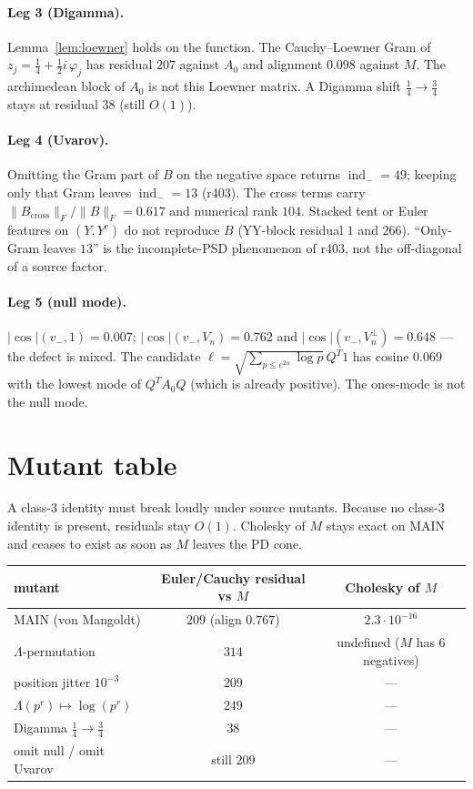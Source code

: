 \documentclass[11pt]{article}
\theoremstyle{remark}
\newcommand{\indm}{\operatorname{ind}_{-}}
\begin{document}
\paragraph{Leg 3 (Digamma).}
Lemma~\ref{lem:loewner} holds on the function.
The Cauchy--Loewner Gram of
$z_j=\tfrac14+\tfrac12 i\,\varphi_j$ has residual $207$
against $A_0$ and alignment $0.098$ against $M$.
The archimedean block of $A_0$ is not this Loewner matrix.
A Digamma shift $\tfrac14\to\tfrac34$ stays at residual $38$
(still $O(1)$).

\paragraph{Leg 4 (Uvarov).}
Omitting the Gram part of $B$ on the negative space returns
$\indm=49$; keeping only that Gram leaves $\indm=13$
(r403).
The cross terms carry $\|B_{\mathrm{cross}}\|_F/\|B\|_F=0.617$
and numerical rank $104$.
Stacked tent or Euler features on $(Y,Y^c)$ do not reproduce
$B$ (YY-block residual $1$ and $266$).
``Only-Gram leaves $13$'' is the incomplete-PSD phenomenon of
r403, not the off-diagonal of a source factor.

\paragraph{Leg 5 (null mode).}
$|{\cos}|(v_-,1)=0.007$;
$|{\cos}|(v_-,V_n)=0.762$ and
$|{\cos}|(v_-,V_n^\perp)=0.648$ --- the defect is mixed.
The candidate
$\ell=\sqrt{\sum_{p\le e^{2\alpha}}\log p}\,Q^T 1$
has cosine $0.069$ with the lowest mode of $Q^T A_0 Q$
(which is already positive).
The ones-mode is not the null mode.

\section{Mutant table}\label{sec:mut}

A class-3 identity must break loudly under source mutants.
Because no class-3 identity is present, residuals stay $O(1)$.
Cholesky of $M$ stays exact on MAIN and ceases to exist as
soon as $M$ leaves the PD cone.

\begin{center}
\small
\begin{tabular}{@{}lcc@{}}
\toprule
mutant & Euler/Cauchy residual vs $M$ & Cholesky of $M$ \\
\midrule
MAIN (von Mangoldt) & $209$ (align $0.767$) & $2.3\cdot 10^{-16}$ \\
$\Lambda$-permutation & $314$ & undefined ($M$ has $6$ negatives) \\
position jitter $10^{-3}$ & $209$ & --- \\
$\Lambda(p^r)\mapsto\log(p^r)$ & $249$ & --- \\
Digamma $\tfrac14\to\tfrac34$ & $38$ & --- \\
omit null / omit Uvarov & still $209$ & --- \\
\bottomrule
\end{tabular}
\end{center}
\end{document}
